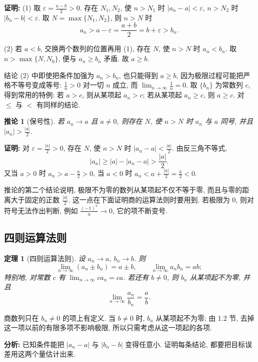 \documentclass[UTF8,openany]{ctexbook}
\theoremstyle{chinesetextbook}
\newtheorem{theorem}{定理}[section]
\newenvironment{cnproof}{\par\indent\textbf{证明:} \ignorespaces}{\par}
\newtheorem*{corollarysingle}{推论}
\begin{document}
\begin{cnproof}
(1) 取 $\displaystyle\varepsilon=\frac{a-b}2>0$. 存在 $N_1,N_2$, 使 $n>N_1$ 时 $|a_n-a|<\varepsilon$, $n>N_2$ 时 $|b_n-b|<\varepsilon$. 取 $N=\max\{N_1,N_2\}$, 则 $n>N$ 时
\[
a_n>a-\varepsilon=\frac{a+b}2=b+\varepsilon>b_n.
\]

(2) 若 $a<b$, 交换两个数列的位置再用 (1), 存在 $N$, 使 $n>N$ 时 $a_n<b_n$. 取 $n>\max\{N,N_0\}$, 便与 $a_n\ge b_n$ 矛盾. 故 $a\ge b$.
\end{cnproof}
结论 (2) 中即使把条件加强为 $a_n>b_n$, 也只能得到 $a\ge b$, 因为极限过程可能把严格不等号变成等号: $\displaystyle\frac1n>0$ 对一切 $n$ 成立, 而 $\displaystyle\lim_{n\to\infty}\frac1n=0$. 取 $\{b_n\}$ 为常数列 $c$, 得到常用的特例: 若 $a>c$, 则从某项起 $a_n>c$; 若从某项起 $a_n\ge c$, 则 $a\ge c$. 对 $\le$ 与 $<$ 有同样的结论.
\begin{corollarysingle}[保号性]
若 $a_n\to a$ 且 $a\ne0$, 则存在 $N$, 使 $n>N$ 时 $a_n$ 与 $a$ 同号, 并且 $\displaystyle|a_n|>\frac{|a|}2$.
\end{corollarysingle}
\begin{cnproof}
对 $\displaystyle\varepsilon=\frac{|a|}2>0$, 存在 $N$, 使 $n>N$ 时 $\displaystyle|a_n-a|<\frac{|a|}2$. 由反三角不等式,
\[
|a_n|\ge|a|-|a_n-a|>\frac{|a|}2.
\]
又当 $a>0$ 时 $\displaystyle a_n>a-\frac a2>0$, 当 $a<0$ 时 $\displaystyle a_n<a+\frac{|a|}2=\frac a2<0$.
\end{cnproof}
推论的第二个结论说明, 极限不为零的数列从某项起不仅不等于零, 而且与零的距离大于固定的正数 $\displaystyle\frac{|a|}2$. 这一点在下面证明商的运算法则时要用到. 若极限为 $0$, 则对符号无法作出判断, 例如 $\displaystyle\frac{(-1)^n}n\to0$, 它的项不断变号.
\subsection{四则运算法则}
\begin{theorem}[四则运算法则]
设 $a_n\to a$, $b_n\to b$. 则
\[
\lim_{n\to\infty}(a_n\pm b_n)=a\pm b,\qquad \lim_{n\to\infty}a_nb_n=ab;
\]
特别地, 对常数 $c$ 有 $\displaystyle\lim_{n\to\infty}ca_n=ca$. 若还有 $b\ne0$, 则 $b_n$ 从某项起不为零, 并且
\[
\lim_{n\to\infty}\frac{a_n}{b_n}=\frac ab.
\]
\end{theorem}
商数列只在 $b_n\ne0$ 的项上有定义. 当 $b\ne0$ 时, $b_n$ 从某项起不为零; 由 1.2 节, 去掉这一项以前的有限多项不影响极限, 所以只需考虑从这一项起的各项.

\par\indent\textbf{分析:} 已知条件能把 $|a_n-a|$ 与 $|b_n-b|$ 变得任意小. 证明每条结论, 都要把目标误差用这两个量估计出来.
\end{document}
